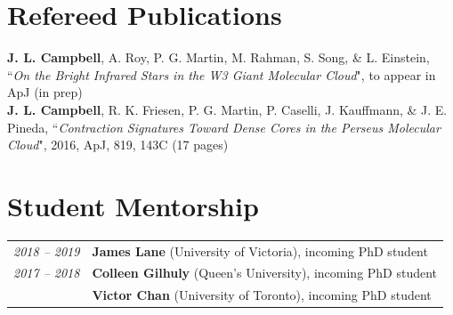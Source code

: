 \documentclass[10pt]{res} %
\begin{document}
\begin{resume}
\section{\Large Refereed Publications}
\vspace{-5pt} %
\noindent\makebox[\linewidth]{\rule{\textwidth}{0.4pt}}
\vspace{-20pt} %

\textbf{J. L. Campbell}, A. Roy, P. G. Martin, M. Rahman, S. Song, \& L. Einstein, ``\textit{On the Bright Infrared Stars in the W3 Giant Molecular Cloud}", to appear in ApJ (in prep) \\
\textbf{J. L. Campbell}, R. K. Friesen, P. G. Martin, P. Caselli, J. Kauffmann, \& J. E. Pineda, ``\textit{Contraction Signatures Toward Dense Cores in the Perseus Molecular Cloud}", 2016, ApJ, 819, 143C (17 pages)


\newpage
\section{\Large Student Mentorship}
\vspace{-5pt} %
\noindent\makebox[\linewidth]{\rule{\textwidth}{0.4pt}}
\vspace{-20pt} %

\begin{table}[h!]
\begin{tabularx}{\textwidth}{lX}
\textit{2018 -- 2019} & \textbf{James Lane} (University of Victoria), incoming PhD student \\
\textit{2017 -- 2018} & \textbf{Colleen Gilhuly} (Queen's University), incoming PhD student \\
                                & \textbf{Victor Chan} (University of Toronto), incoming PhD student
\end{tabularx}
\end{table}



\end{resume}
\end{document}
